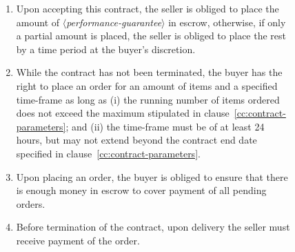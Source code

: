 \documentclass{article}
\newcommand{\placeholder}[1]{\mbox{$\langle$\textit{#1}$\rangle$}}
\begin{document}
\begin{figure}[t]
{\begin{enumerate}
     \item \label{cc:performance-guarantee-escrow} Upon accepting this contract, the seller is obliged to place the amount of \placeholder{performance-guarantee} in escrow, otherwise, if only a partial amount is placed, the seller is obliged to place the rest by a time period at the buyer's discretion.%
     \item \label{cc:right-to-order} While the contract has not been terminated, the buyer has the right to place an order for an amount of items and a specified time-frame as long as (i) the running number of items ordered does not exceed the maximum stipulated in clause~\ref{cc:contract-parameters}; and (ii) the time-frame must be of at least 24 hours, but may not extend beyond the contract end date specified in clause~\ref{cc:contract-parameters}. 
     \item \label{cc:escrow-payment-for-order} Upon placing an order, the buyer is obliged to ensure that there is enough money in escrow to cover payment of all pending orders.
     \item Before termination of the contract, upon delivery the seller must receive payment of the order.

\end{enumerate}}
\end{figure}
\end{document}
